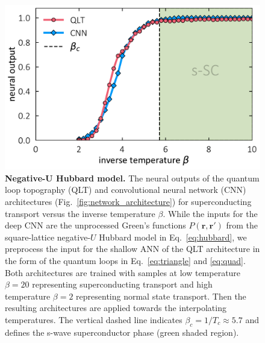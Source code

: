 \documentclass[amsmath,amssymb, aps, prx, longbibliography, twocolumn]{revtex4-1}
\begin{document}
\begin{figure}[t]
\includegraphics[scale=.43]{fig1.pdf}
\caption{
{\bf Negative-U Hubbard model.} The neural outputs of the quantum loop topography (QLT) and convolutional neural network (CNN) architectures (Fig.~\ref{fig:network_architecture}) for superconducting transport versus the inverse temperature $\beta$. While the inputs for the deep CNN are the unprocessed Green's functions $P(\mathbf{r},\mathbf{r}')$ from the square-lattice negative-$U$ Hubbard model in Eq.~\eqref{eq:hubbard}, 
we preprocess the input for the shallow ANN of the QLT architecture in the form of the quantum loops in Eq.~\eqref{eq:triangle} and \ref{eq:quad}. Both architectures are trained with samples at low temperature $\beta=20$ representing superconducting transport and high temperature $\beta=2$ representing normal state transport. Then the resulting architectures are applied towards the interpolating temperatures. The vertical dashed line indicates $\beta_c = 1/T_c \approx 5.7$ \cite{Scalettar1989, Denteneer1993} and defines the s-wave superconductor phase (green shaded region).}\label{fig:hubbard}
\end{figure}
\end{document}
